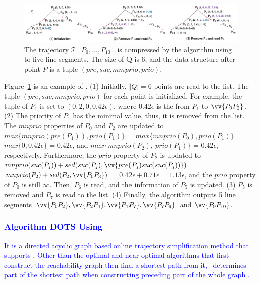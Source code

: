 \begin{figure}[tb!]
	\centering
	\includegraphics[scale=0.48]{Figures/Fig-Squishe.jpg}
	\vspace{-2ex}
	\caption{\small The trajectory $\dddot{\mathcal{T}}[P_0, \ldots, P_{10}]$ is compressed by the \squishe algorithm using \sed to five line segments. The size of Q is 6, and the data structure after point $P$ is a tuple $(pre, suc, mmprio, prio)$. }
	\vspace{-1ex}
	\label{fig:squishe}
\end{figure}



\begin{example}
	\label{exm-alg-squishe}
	Figure~\ref{fig:squishe} is an example of \squishe.
	(1) Initially, $|Q| = 6$ points are read to the list. The tuple $(pre, suc, mmprio, prio)$ for each point is initialized. For example, the tuple of $P_1$ is set to $(0, 2, 0, 0.42\epsilon)$, where $0.42\epsilon$ is the \sed from $P_1$ to $\vv{P_0P_2}$.
	(2) The priority of $P_1$ has the minimal value, thus, it is removed from the list.
	The $mnprio$ properties of $P_0$ and $P_2$ are updated to $max\{mnprio(pre(P_1)), prio(P_1)\}$ = $max\{mnprio(P_0), prio(P_1)\}$ = $max\{0, 0.42\epsilon\}$ = $0.42\epsilon$, and $max\{mnprio(P_2), ~prio(P_1)\}$ = $0.42\epsilon$, respectively.
	Furthermore, the $prio$ property of $P_2$ is updated to $mnprio(suc(P_j)) + sed(suc(P_j),\vv{pre(P_{j})suc(suc(P_{j}))})$ = $mnprio(P_2) + sed(P_2,\vv{P_0P_3})$ = $0.42\epsilon + 0.71\epsilon$ = $1.13\epsilon$, and the $prio$ property of $P_0$ is still $\infty$.
	Then, $P_6$ is read, and the information of $P_5$ is updated.
	(3) $P_5$ is removed and $P_7$ is read to the list.
	(4) {Finally, the algorithm outputs 5 line segments $\vv{P_0P_2},\vv{P_2P_4},\vv{P_4P_7},\vv{P_7P_9}$ and $\vv{P_9P_{10}}$}.
\end{example}

\subsubsection{\textcolor{blue}{Algorithm DOTS Using \lissed~\cite{Cao:Dots}}}
\textcolor{blue}{It is a directed acyclic graph based online trajectory simplification method that supports \lissed. Other than the optimal and near optimal algorithms \cite{Chen:Fast,Daescu:metric} that first construct the reachability graph then find a shortest path from it, \dagots~determines part of the shortest path when constructing preceding part of the whole graph \cite{Cao:Dots}.}

